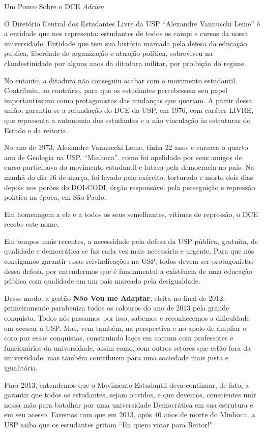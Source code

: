 \begin{secao}{Um Pouco Sobre o DCE}
{\em Adrian}

O Diretório Central dos Estudantes Livre da USP ``Alexandre Vannucchi Leme'' é a
entidade que nos representa: estudantes de todos os campi e cursos da nossa universidade.
Entidade que tem sua história marcada pela defesa da educação publica, liberdade
de organização e atuação política, sobreviveu na clandestinidade por alguns anos
da ditadura militar, por proibição do regime.

No entanto, a ditadura não conseguiu acabar com o movimento estudantil. Contribuiu,
ao contrário, para que os estudantes percebessem seu papel importantíssimo como
protagonistas das mudanças que queriam. A partir dessa união, garantiu-se a
refundação do DCE da USP, em 1976, com caráter LIVRE, que representa a autonomia
dos estudantes e a não vinculação às estruturas do Estado e da reitoria.

No ano de 1973, Alexandre Vannucchi Leme, tinha 22 anos e cursava o quarto ano
de Geologia na USP. ``Minhoca'', como foi apelidado por seus amigos de curso participava
do movimento estudantil e lutava pela democracia no país. Na manhã do dia 16 de março,
foi levado pelo exército, torturado e morto dois dias depois nos porões do DOI-CODI,
órgão responsável pela perseguição e repressão política na época, em São Paulo.

Em homenagem a ele e a todos os seus semelhantes, vítimas de repressão, o DCE recebe este nome.

Em tempos mais recentes, a necessidade pela defesa da USP pública, gratuita, de qualidade
e democrática se faz cada vez mais necessária e urgente. Para que nós consigamos
garantir essas reivindicações na USP, todos devem ser protagonistas dessa defesa,
por entendermos que é fundamental a existência de uma educação pública com qualidade
em um país marcado pela desigualdade.

Desse modo, a gestão {\bf Não Vou me Adaptar}, eleita no final de 2012, primeiramente
parabeniza todos os calouros do ano de 2013 pela grande conquista.
Todos nós passamos por isso, sabemos e reconhecemos a dificuldade em acessar a USP.
Mas, vem também, na perspectiva e no apelo de ampliar o coro por essas conquistas,
construindo laços em comum com professores e funcionários da universidade,
assim como, com outros setores que estão fora da universidade, mas também contribuem
para uma sociedade mais justa e igualitária.

Para 2013, entendemos que o Movimento Estudantil deva continuar, de fato, a garantir
que todos os estudantes, sejam ouvidos, e que devemos, conscientes unir nossa
mão para batalhar por uma universidade Democrática em sua estrutura e em seu acesso.
Faremos com que em 2013, após 40 anos de morte do Minhoca, a USP saiba que os estudantes
gritam ``Eu quero votar para Reitor!''

\end{secao}
